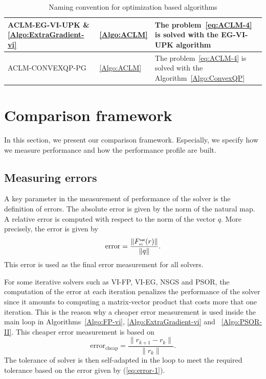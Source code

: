 \begin{table}
\begin{tabular}{|l|l|p{}|}
    \\
    \hline
    \sf ACLM-EG-VI-UPK \& \ref{Algo:ExtraGradient-vi}
    & \ref{Algo:ACLM}
    & The problem~\ref{eq:ACLM-4} is solved with the {\sf EG-VI-UPK} algorithm
    \\
    \hline
    \sf ACLM-CONVEXQP-PG
    &   \ref{Algo:ACLM}
    &  The problem~\ref{eq:ACLM-4} is solved with the Algorithm~\ref{Algo:ConvexQP}
    \\
    \hline
  \end{tabular}
  \caption{Naming convention for optimization based  algorithms}
  \label{tab:OPTI-algos}
\end{table}

\clearpage
\section{Comparison framework}
\label{sec:numericalcomparisons}
In this section, we present our comparison framework. Especially, we specify how we measure performance and how the performance profile are built.

\subsection{Measuring errors}
\label{Sec:MeasuringErrors}

A key parameter in the measurement of performance of the solver is the definition of errors. The absolute error is given by the  norm of the natural map. A relative error is computed with respect to the norm of the vector $q$. More precisely, the error is given by
\begin{equation}
  \label{eq:error-1}
  \mbox{error} = \frac{\|F^\nat_\vitwo(r)\|}{\|q\|}.
\end{equation}
This error is used as the  final error measurement for all solvers.

For some iterative solvers such as {\sf VI-FP}, {\sf VI-EG}, {\sf NSGS} and {\sf PSOR}, the computation of the error at each iteration penalizes the performance of the solver  since it amounts to computing a matrix-vector product that costs more that one iteration. This is the reason why  a cheaper error measurement is used inside the main loop in Algorithms~\ref{Algo:FP-vi}, \ref{Algo:ExtraGradient-vi} and ~\ref{Algo:PSOR-II}. This cheaper error measurement is  based on
\begin{equation}
  \label{eq:error-2}
  \mbox{error}_{\mbox{cheap}} = \frac{\|r_{k+1}-r_{k}\|}{\|r_k\|}.
\end{equation}
The tolerance of solver is then self-adapted in the loop to meet the required tolerance based on the error given by (\ref{eq:error-1}).

